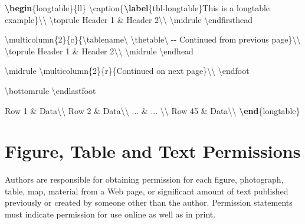 \documentclass[Journal,LineNumbers]{ascelike-new}
\newenvironment{Shaded}{\begin{snugshade}}{\end{snugshade}}
\newcommand{\ExtensionTok}[1]{\textcolor[rgb]{0.00,0.23,0.31}{#1}}
\newcommand{\FunctionTok}[1]{\textcolor[rgb]{0.28,0.35,0.67}{#1}}
\newcommand{\KeywordTok}[1]{\textcolor[rgb]{0.00,0.23,0.31}{\textbf{#1}}}
\newcommand{\NormalTok}[1]{\textcolor[rgb]{0.00,0.23,0.31}{#1}}
\newcommand{\OperatorTok}[1]{\textcolor[rgb]{0.37,0.37,0.37}{#1}}
\begin{document}
\begin{Shaded}
\begin{Highlighting}[]
\KeywordTok{\textbackslash{}begin}\NormalTok{\{}\ExtensionTok{longtable}\NormalTok{\}\{ll\}}
\FunctionTok{\textbackslash{}caption}\NormalTok{\{}\KeywordTok{\textbackslash{}label}\NormalTok{\{}\ExtensionTok{tbl{-}longtable}\NormalTok{\}This is a longtable example\}}\FunctionTok{\textbackslash{}\textbackslash{}}
\FunctionTok{\textbackslash{}toprule}
\NormalTok{Header 1 }\OperatorTok{\&}\NormalTok{ Header 2}\FunctionTok{\textbackslash{}\textbackslash{}}
\FunctionTok{\textbackslash{}midrule}
\FunctionTok{\textbackslash{}endfirsthead}

\FunctionTok{\textbackslash{}multicolumn}\NormalTok{\{2\}\{c\}\{}\FunctionTok{\textbackslash{}tablename\textbackslash{} \textbackslash{}thetable\textbackslash{} }\NormalTok{{-}{-} Continued from previous page\}}\FunctionTok{\textbackslash{}\textbackslash{}}
\FunctionTok{\textbackslash{}toprule}
\NormalTok{Header 1 }\OperatorTok{\&}\NormalTok{ Header 2}\FunctionTok{\textbackslash{}\textbackslash{}}
\FunctionTok{\textbackslash{}midrule}
\FunctionTok{\textbackslash{}endhead}

\FunctionTok{\textbackslash{}midrule}
\FunctionTok{\textbackslash{}multicolumn}\NormalTok{\{2\}\{r\}\{Continued on next page\}}\FunctionTok{\textbackslash{}\textbackslash{}}
\FunctionTok{\textbackslash{}endfoot}

\FunctionTok{\textbackslash{}bottomrule}
\FunctionTok{\textbackslash{}endlastfoot}

\NormalTok{Row 1  }\OperatorTok{\&}\NormalTok{ Data}\FunctionTok{\textbackslash{}\textbackslash{}}
\NormalTok{Row 2  }\OperatorTok{\&}\NormalTok{ Data}\FunctionTok{\textbackslash{}\textbackslash{}}
\NormalTok{... }\OperatorTok{\&}\NormalTok{ ... }\FunctionTok{\textbackslash{}\textbackslash{}}
\NormalTok{Row 45 }\OperatorTok{\&}\NormalTok{ Data}\FunctionTok{\textbackslash{}\textbackslash{}}
\KeywordTok{\textbackslash{}end}\NormalTok{\{}\ExtensionTok{longtable}\NormalTok{\}}
\end{Highlighting}
\end{Shaded}

\section{Figure, Table and Text
Permissions}\label{figure-table-and-text-permissions}

Authors are responsible for obtaining permission for each figure,
photograph, table, map, material from a Web page, or significant amount
of text published previously or created by someone other than the
author. Permission statements must indicate permission for use online as
well as in print.
\end{document}
